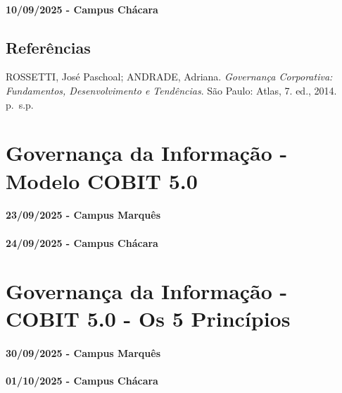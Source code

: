 \documentclass[
]{book}
\begin{document}
\subsubsection*{10/09/2025 - Campus Chácara}\label{campus-chuxe1cara-5}

\section{Referências}\label{referuxeancias-4}

ROSSETTI, José Paschoal; ANDRADE, Adriana. \emph{Governança Corporativa: Fundamentos, Desenvolvimento e Tendências}. São Paulo: Atlas, 7. ed., 2014. p.~s.p.

\chapter{Governança da Informação - Modelo COBIT 5.0}\label{governanuxe7a-da-informauxe7uxe3o---modelo-cobit-5.0}

\subsubsection*{23/09/2025 - Campus Marquês}\label{campus-marquuxeas-6}

\subsubsection*{24/09/2025 - Campus Chácara}\label{campus-chuxe1cara-6}

\chapter{Governança da Informação - COBIT 5.0 - Os 5 Princípios}\label{governanuxe7a-da-informauxe7uxe3o---cobit-5.0---os-5-princuxedpios}

\subsubsection*{30/09/2025 - Campus Marquês}\label{campus-marquuxeas-7}

\subsubsection*{01/10/2025 - Campus Chácara}\label{campus-chuxe1cara-7}
\end{document}
